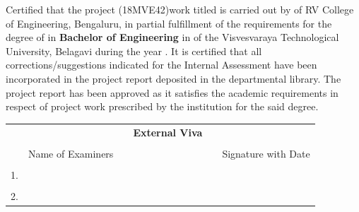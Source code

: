 \begin{spacing}{1.5}
\noindent Certified that the \fi project (18MVE42)work titled \textbf{\textit{\printTitle}} is carried out by
\fi
of RV College of Engineering, Bengaluru, in partial fulfillment of the requirements for the degree of  \ifPG \textbf{\printMastersInLF} in \textbf{\printMastersPrgName} \else\textbf{Bachelor of Engineering} in \textbf{\printDepartmentLF} \fi of the Visvesvaraya Technological University, Belagavi during the year \printAcadYear. It is certified that all corrections/suggestions indicated for the Internal Assessment have been incorporated in the \fi project report deposited in the departmental library. The \fi project report has been approved as it satisfies the academic requirements in respect of \fi project work prescribed by the institution for the said degree.\\ \par
\end{spacing}

\begin{table}[H]
\centering
{}
\end{table}

\begin{table}[H]
\centering
\begin{tabular}{lccp{6cm}cc}
&&&\textbf{External Viva}&&\\
&&&&&\\
&Name of Examiners &&& & Signature with Date\\
&&&&&\\
1.&&&&&\\
&&&&&\\
2.&&&&&\\
\end{tabular}%
\end{table}

